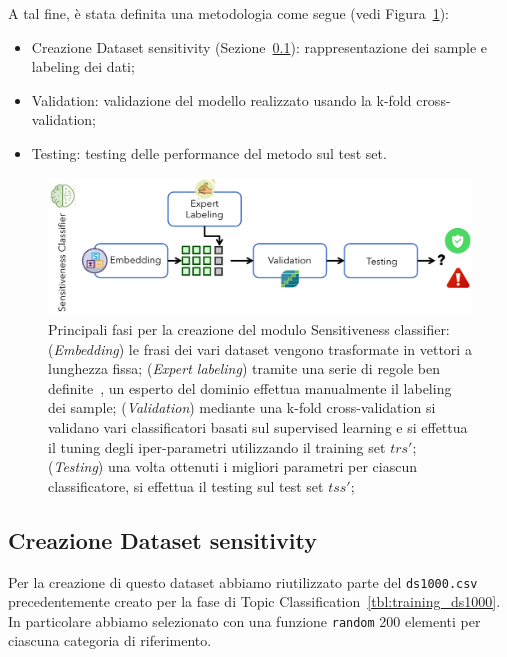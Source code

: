 A tal fine, è stata definita una metodologia come segue (vedi Figura~\ref{fig:methodsens}):
\begin{itemize}
    \item Creazione Dataset sensitivity (Sezione~\ref{ssec:create_sens_ds}): rappresentazione dei sample e labeling dei dati;
    \item Validation: validazione del modello realizzato usando la k-fold cross-validation;
    \item Testing: testing delle performance del metodo sul test set.
\end{itemize}

\begin{figure}[h!t]
    \centering
    \includegraphics[width=15cm]{Figure/grafici/sensitivenessmethod_cropped.pdf}
    \caption{Principali fasi per la creazione del modulo Sensitiveness classifier: (\textit{Embedding}) le frasi dei vari dataset vengono trasformate in vettori a lunghezza fissa; (\textit{Expert labeling}) tramite una serie di regole ben definite~\cite{}, un esperto del dominio effettua manualmente il labeling dei sample; (\textit{Validation}) mediante una k-fold cross-validation si validano vari classificatori basati sul supervised learning e si effettua il tuning degli iper-parametri utilizzando il training set $trs'$; (\textit{Testing}) una volta ottenuti i migliori parametri per ciascun classificatore, si effettua il testing sul test set $tss'$;   }
    \label{fig:methodsens}
\end{figure}

\subsection{Creazione Dataset sensitivity}
\label{ssec:create_sens_ds}
Per la creazione di questo dataset abbiamo riutilizzato parte del {\tt ds1000.csv} precedentemente creato per la fase di Topic Classification~\ref{tbl:training_ds1000}. In particolare abbiamo selezionato con una funzione {\tt random} 200 elementi per ciascuna categoria di riferimento.

